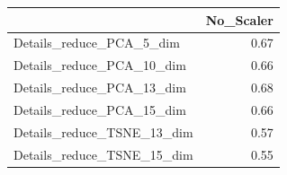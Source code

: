 \documentclass[12pt,italian]{report}
\begin{document}
\begin{table}[h]
	\begin{center}
		\begin{adjustbox}{max width=\textwidth, max totalheight={5.5cm}}
			\begin{tabular}{lr}
				\toprule
				{} &  No\_Scaler \\
				\midrule
				Details\_reduce\_PCA\_5\_dim   &   0.67 \\
				Details\_reduce\_PCA\_10\_dim  &   0.66 \\
				Details\_reduce\_PCA\_13\_dim  &   0.68 \\
				Details\_reduce\_PCA\_15\_dim  &   0.66 \\
				Details\_reduce\_TSNE\_13\_dim &   0.57 \\
				Details\_reduce\_TSNE\_15\_dim &   0.55 \\
				\bottomrule
			\end{tabular}
		\end{adjustbox}
	\end{center}
\end{table}
\end{document}
